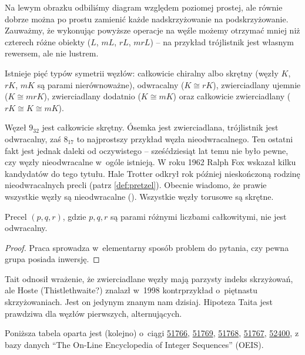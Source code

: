 Na lewym obrazku odbiliśmy diagram względem poziomej prostej,
ale równie dobrze można po prostu zamienić każde nadskrzyżowanie na podskrzyżowanie.
Zauważmy, że wykonując powyższe operacje na węźle możemy otrzymać mniej niż czterech różne obiekty
($L$, $mL$, $rL$, $mrL$) -- na przykład trójlistnik jest własnym rewersem, ale nie lustrem.

\begin{definition}
    Istnieje pięć typów symetrii węzłów:
    całkowicie chiralny albo skrętny (węzły $K$, $rK$, $mK$ są parami nierównoważne),
    odwracalny ($K \cong rK$),
    zwierciadlany ujemnie ($K \cong mrK$),
    zwierciadlany dodatnio ($K \cong mK$) oraz
    całkowicie zwierciadlany ($rK \cong K \cong mK$).
\end{definition}

Węzeł $9_{32}$ jest całkowicie skrętny.
Ósemka jest zwierciadlana, trójlistnik jest odwracalny,
zaś $8_{17}$ to najprostszy przykład węzła nieodwracalnego.
Ten ostatni fakt jest jednak daleki od oczywistego --
sześćdziesiąt lat temu nie było pewne,
czy węzły nieodwracalne w~ogóle istnieją.
W roku 1962 Ralph Fox wskazał kilku kandydatów do tego tytułu.
Hale Trotter odkrył rok później nieskończoną rodzinę nieodwracalnych precli (patrz \ref{def:pretzel}).
Obecnie wiadomo, że prawie wszystkie węzły są nieodwracalne (\cite[s.~46]{murasugi96}).
Wszystkie węzły torusowe są skrętne.

\begin{proposition}[Trotter, 1963] \label{trotter}
    Precel $(p, q, r)$, gdzie $p, q, r$ są parami różnymi liczbami całkowitymi, nie jest odwracalny.
\end{proposition}

\begin{proof}
    Praca \cite{trotter63} sprowadza w~elementarny sposób problem do pytania, czy pewna grupa posiada inwersję.
\end{proof}

Tait odnosił wrażenie, że zwierciadlane węzły mają parzysty indeks skrzyżowań,
ale Hoste (Thistlethwaite?) znalazł w~1998 kontrprzykład o~piętnastu skrzyżowaniach.
Jest on jedynym znanym nam dzisiaj.
Hipoteza Taita jest prawdziwa dla węzłów pierwszych, alternujących.

Poniższa tabela oparta jest (kolejno) o~ciągi
\href{https://oeis.org/A051766}{51766},
\href{https://oeis.org/A051769}{51769},
\href{https://oeis.org/A051768}{51768},
\href{https://oeis.org/A051767}{51767},
\href{https://oeis.org/A052400}{52400},
z bazy danych ``The On-Line Encyclopedia of Integer Sequences'' (OEIS).

